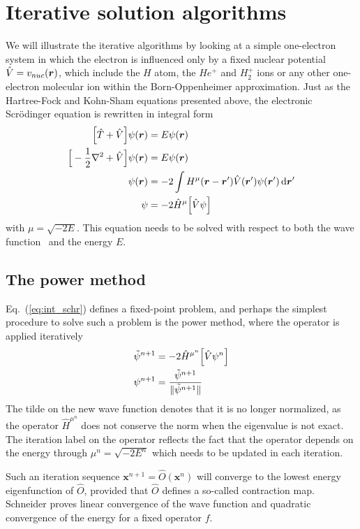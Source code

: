 \section{Iterative solution algorithms}
We will illustrate the iterative algorithms by looking at a simple one-electron system in which the 
electron is influenced only by a fixed nuclear potential $\hat{V} = v_{nuc}(\boldsymbol r)$, which include 
the $H$ atom, the $He^+$ and $H_2^+$ ions or any other one-electron molecular ion within the 
Born-Oppenheimer approximation. Just as the Hartree-Fock and Kohn-Sham equations presented above, 
the electronic Scr\"{o}dinger equation is rewritten in integral form
\begin{align}
    \Big[\hat{T} + \hat{V}\Big]\psi(\boldsymbol r) &= E\psi(\boldsymbol r)\\
    \Big[-\frac{1}{2}\nabla^2 + \hat{V}\Big]\psi(\boldsymbol r) &= E\psi(\boldsymbol r)\\
    \psi(\boldsymbol r)&=-2\int H^{\mu}(\boldsymbol r-\boldsymbol r')\hat{V}(\boldsymbol r')\psi(\boldsymbol r')\,\mathrm{d}\boldsymbol r'\\
    \label{eq:int_schr}
    \psi &= -2 \hat{H}^{\mu}\Big[\hat{V}\psi\Big]
\end{align}
with $\mu = \sqrt{-2E}$. This equation needs to be solved with respect to both the wave function
\wavefunction\ and the energy $E$.

\subsection{The power method}
Eq.~(\ref{eq:int_schr}) defines a fixed-point problem, and perhaps the simplest procedure to solve 
such a problem is the power method, where the operator is applied iteratively
\begin{align}
    \label{eq:power}
    \tilde{\psi}^{n+1} &= -2 \hat{H}^{\mu^n}\Big[\hat{V}\psi^n\Big]\\
    \psi^{n+1} &= \frac{\tilde{\psi}^{n+1}}{\|\tilde{\psi}^{n+1}\|}
\end{align}
The tilde on the new wave function denotes that it is no longer normalized, 
as the operator $\hat{H}^{\mu^n}$ does not conserve the norm when the eigenvalue 
is not exact\cite{Kalos}. The iteration label on the operator reflects the 
fact that the operator depends on the energy through $\mu^n = \sqrt{-2E^n}$ 
which needs to be updated in each iteration.

Such an iteration sequence $\boldsymbol{x}^{n+1} = \hat{O}(\boldsymbol{x}^n)$ will converge to the 
lowest energy eigenfunction of $\hat{O}$, provided that $\hat{O}$ defines a so-called contraction map. 
Schneider\cite{Schneider} proves linear convergence of the wave function and quadratic 
convergence of the energy for a fixed operator $f$. 

